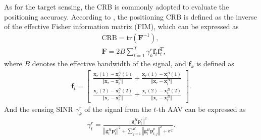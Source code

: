\documentclass[twocolumn,journal]{IEEEtran}
\begin{document}
As for the target sensing, the CRB is commonly adopted to evaluate the positioning accuracy. According to \cite{huCollaborative2025}, the positioning CRB is defined as the inverse of the effective Fisher information matrix (FIM), which can be expressed as 
\begin{align}
    &\text{CRB} = \text{tr}(\mathbf{F}^{-1}),\\
    &\mathbf{F} = 2B\sum_{t=1}^{T} \gamma_{k}^{r}\boldsymbol{f}_{t}\boldsymbol{f}^{T}_{t},
\end{align}
where \(B\) denotes the effective bandwidth of the signal, and \(\boldsymbol{f}_{k}\) is defined as
\begin{align}
 \boldsymbol{f}_{t} = 
    \begin{bmatrix}
 \left.\frac{\boldsymbol{x}_{r}(1) - \boldsymbol{x}^U_{t}(1)}{\Vert \boldsymbol{x}_{r} - \boldsymbol{x}^U_{t} \Vert} + \frac{\boldsymbol{x}_{r}(1) - \boldsymbol{x}^B_{t}(1)}{\Vert \boldsymbol{x}_{r} - \boldsymbol{x}^B_{t} \Vert}\right.\\
 \left.\frac{\boldsymbol{x}_{r}(2) - \boldsymbol{x}^U_{t}(2)}{\Vert \boldsymbol{x}_{r} - \boldsymbol{x}^U_{t} \Vert} + \frac{\boldsymbol{x}_{r}(2) - \boldsymbol{x}^B_{t}(2)}{\Vert \boldsymbol{x}_{r} - \boldsymbol{x}^B_{t} \Vert}\right.
    \end{bmatrix}.
\end{align}
And the sensing SINR \(\gamma_{k}^{r}\) of the signal from the \(t\)-th AAV can be expressed as
\begin{align}
    \gamma_{t}^{r} = \frac{\left\Vert \boldsymbol{g}^{H}_{t}\boldsymbol{p}^{r}_{t} \right\Vert^2}{\left\Vert \boldsymbol{g}^{H}_{t}\boldsymbol{p}^{c}_{t} \right\Vert^2 + \sum_{j=1}^{K}\left\Vert \boldsymbol{g}^{H}_{t}\boldsymbol{p}^{p}_{t,j} \right\Vert^2 + \sigma^2}.\label{eq:SINRr}
\end{align}
\end{document}
